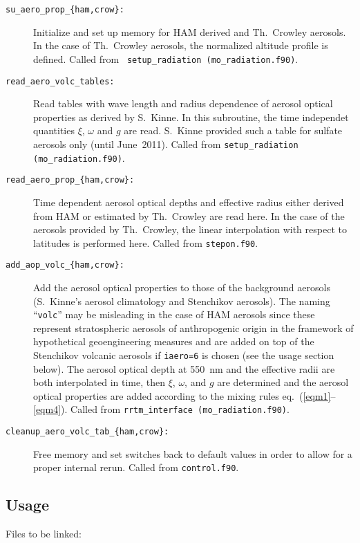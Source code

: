 \begin{appendix}
\begin{description}
\item[{\tt su\_aero\_prop\_\{ham,crow\}:}] Initialize and set up memory
for HAM derived and Th.~Crowley aerosols. In the case of Th.~Crowley aerosols,
the normalized altitude profile is defined. Called from {\tt
  setup\_radiation (mo\_radiation.f90)}. 
\item[{\tt read\_aero\_volc\_tables:}] Read tables with wave length
  and radius dependence of aerosol optical properties as derived by
  S.~Kinne. In this subroutine, the time independet quantities $\xi$,
  $\omega$ and $g$ are read. S.~Kinne provided such a table for
  sulfate aerosols only (until June~2011). Called from {\tt setup\_radiation
    (mo\_radiation.f90)}.
\item[{\tt read\_aero\_prop\_\{ham,crow\}:}] Time dependent aerosol
  optical depths and effective radius either derived from HAM or
  estimated by Th.~Crowley are read here. In the case of the aerosols
  provided by Th.~Crowley, the linear interpolation with respect to
  latitudes is performed here. Called from {\tt stepon.f90}.
\item[{\tt add\_aop\_volc\_\{ham,crow\}:}] Add the aerosol optical
  properties to those of the background aerosols (S.~Kinne's aerosol
  climatology and Stenchikov aerosols). The naming ``{\tt volc}'' may
  be misleading in the case of HAM aerosols since these represent
  stratospheric aerosols of anthropogenic origin in the framework of
  hypothetical geoengineering measures and are added on
  top of the Stenchikov volcanic aerosols if {\tt iaero=6} is chosen
  (see the usage section below). The aerosol optical depth at 550~nm
  and the effective radii are both interpolated in time, then $\xi$,
  $\omega$, and $g$ are determined and the aerosol optical properties
  are added according to the mixing rules
  eq.~(\ref{eqm1}--\ref{eqm4}). Called from {\tt rrtm\_interface
    (mo\_radiation.f90)}.
\item[{\tt cleanup\_aero\_volc\_tab\_\{ham,crow\}:}] Free memory and
  set switches back to default values in order to allow for a proper
  internal rerun. Called from {\tt control.f90}.
\end{description}

\subsection{Usage}
Files to be linked:


\end{appendix}
